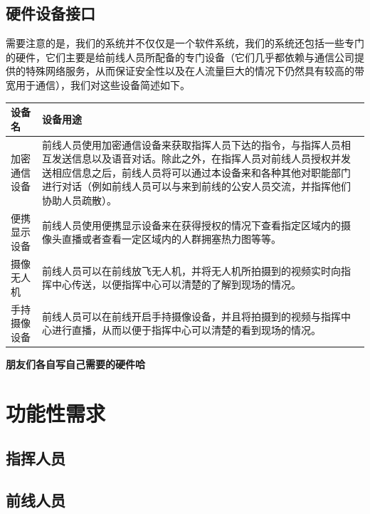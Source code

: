 \documentclass{ctexrep}
\begin{document}
\subsection{硬件设备接口}
需要注意的是，我们的系统并不仅仅是一个软件系统，我们的系统还包括一些专门的硬件，它们主要是给前线人员所配备的专门设备（它们几乎都依赖与通信公司提供的特殊网络服务，从而保证安全性以及在人流量巨大的情况下仍然具有较高的带宽用于通信），我们对这些设备简述如下。
\begin{longtable}{p{2cm}|p{10cm}}
\hline
设备名 & 设备用途 \\
\hline
\hline
加密通信设备 & 前线人员使用加密通信设备来获取指挥人员下达的指令，与指挥人员相互发送信息以及语音对话。除此之外，在指挥人员对前线人员授权并发送相应信息之后，前线人员将可以通过本设备来和各种其他对职能部门进行对话（例如前线人员可以与来到前线的公安人员交流，并指挥他们协助人员疏散）。 \\
\hline
便携显示设备 & 前线人员使用便携显示设备来在获得授权的情况下查看指定区域内的摄像头直播或者查看一定区域内的人群拥塞热力图等等。 \\
\hline
摄像无人机 & 前线人员可以在前线放飞无人机，并将无人机所拍摄到的视频实时向指挥中心传送，以便指挥中心可以清楚的了解到现场的情况。 \\
\hline
手持摄像设备 & 前线人员可以在前线开启手持摄像设备，并且将拍摄到的视频与指挥中心进行直播，从而以便于指挥中心可以清楚的看到现场的情况。 \\
\hline
\end{longtable}
\textbf{朋友们各自写自己需要的硬件哈}
\section{功能性需求}
\subsection{指挥人员}
\subsection{前线人员}
\end{document}
